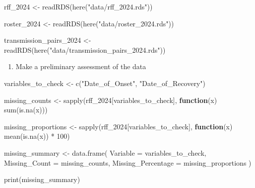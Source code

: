 \documentclass[
  letterpaper,
  DIV=11,
  numbers=noendperiod]{scrartcl}
\newenvironment{Shaded}{\begin{snugshade}}{\end{snugshade}}
\newcommand{\AttributeTok}[1]{\textcolor[rgb]{0.40,0.45,0.13}{#1}}
\newcommand{\ControlFlowTok}[1]{\textcolor[rgb]{0.00,0.23,0.31}{\textbf{#1}}}
\newcommand{\DecValTok}[1]{\textcolor[rgb]{0.68,0.00,0.00}{#1}}
\newcommand{\FunctionTok}[1]{\textcolor[rgb]{0.28,0.35,0.67}{#1}}
\newcommand{\NormalTok}[1]{\textcolor[rgb]{0.00,0.23,0.31}{#1}}
\newcommand{\OtherTok}[1]{\textcolor[rgb]{0.00,0.23,0.31}{#1}}
\newcommand{\SpecialCharTok}[1]{\textcolor[rgb]{0.37,0.37,0.37}{#1}}
\newcommand{\StringTok}[1]{\textcolor[rgb]{0.13,0.47,0.30}{#1}}
\providecommand{\tightlist}{%
  \setlength{\itemsep}{0pt}\setlength{\parskip}{0pt}}\usepackage{longtable,booktabs,array}
\begin{document}
\begin{Shaded}
\begin{Highlighting}[]
\NormalTok{ rff\_2024 }\OtherTok{\textless{}{-}} \FunctionTok{readRDS}\NormalTok{(}\FunctionTok{here}\NormalTok{(}\StringTok{"data/rff\_2024.rds"}\NormalTok{))}

\NormalTok{roster\_2024 }\OtherTok{\textless{}{-}} \FunctionTok{readRDS}\NormalTok{(}\FunctionTok{here}\NormalTok{(}\StringTok{"data/roster\_2024.rds"}\NormalTok{))}

\NormalTok{transmission\_pairs\_2024 }\OtherTok{\textless{}{-}} \FunctionTok{readRDS}\NormalTok{(}\FunctionTok{here}\NormalTok{(}\StringTok{"data/transmission\_pairs\_2024.rds"}\NormalTok{))}
\end{Highlighting}
\end{Shaded}

\begin{enumerate}
\def\labelenumi{\arabic{enumi}.}
\tightlist
\item
  Make a preliminary assessment of the data
\end{enumerate}

\begin{Shaded}
\begin{Highlighting}[]
\NormalTok{variables\_to\_check }\OtherTok{\textless{}{-}} \FunctionTok{c}\NormalTok{(}\StringTok{"Date\_of\_Onset"}\NormalTok{, }\StringTok{"Date\_of\_Recovery"}\NormalTok{)}

\NormalTok{missing\_counts }\OtherTok{\textless{}{-}} \FunctionTok{sapply}\NormalTok{(rff\_2024[variables\_to\_check], }\ControlFlowTok{function}\NormalTok{(x) }\FunctionTok{sum}\NormalTok{(}\FunctionTok{is.na}\NormalTok{(x)))}

\NormalTok{missing\_proportions }\OtherTok{\textless{}{-}} \FunctionTok{sapply}\NormalTok{(rff\_2024[variables\_to\_check], }\ControlFlowTok{function}\NormalTok{(x) }\FunctionTok{mean}\NormalTok{(}\FunctionTok{is.na}\NormalTok{(x)) }\SpecialCharTok{*} \DecValTok{100}\NormalTok{)}

\NormalTok{missing\_summary }\OtherTok{\textless{}{-}} \FunctionTok{data.frame}\NormalTok{(}
  \AttributeTok{Variable =}\NormalTok{ variables\_to\_check,}
  \AttributeTok{Missing\_Count =}\NormalTok{ missing\_counts,}
  \AttributeTok{Missing\_Percentage =}\NormalTok{ missing\_proportions}
\NormalTok{)}

\FunctionTok{print}\NormalTok{(missing\_summary)}
\end{Highlighting}
\end{Shaded}
\end{document}

